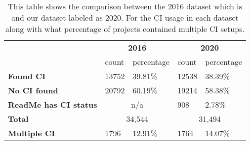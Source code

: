 \begin{table}[!ht]
    \begin{tabular}{l|l|l|l|l|}
    \cline{2-5}
                                                & \multicolumn{2}{c|}{\textbf{2016}} & \multicolumn{2}{c|}{\textbf{2020}} \\ \cline{2-5} 
                                                & count         & percentage         & count         & percentage         \\ \hline
    \multicolumn{1}{|l|}{\textbf{Found CI}}          & 13752         & 39.81\%            & 12538         & 38.39\%            \\ \hline
    \multicolumn{1}{|l|}{\textbf{No CI found}}       & 20792         & 60.19\%            & 19214         & 58.38\%            \\ \hline
    \multicolumn{1}{|l|}{\textbf{ReadMe has CI status}}      & \multicolumn{2}{c|}{n/a}           & 908           & 2.78\%             \\ \hline
    \multicolumn{1}{|l|}{\textbf{Total}}      & \multicolumn{2}{c|}{34,544}           & \multicolumn{2}{c|}{31,494}             \\ \hline
    \multicolumn{1}{|l|}{\textbf{Multiple CI}} & 1796          & 12.91\%            & 1764          & 14.07\%            \\ \hline

    \end{tabular}
    \label{table:comparison_dataset}

    \caption{This table shows the comparison between the 2016 dataset which is\citet{Hilton2016} and our dataset labeled as 2020. For the CI usage in each dataset along with what percentage of projects contained multiple CI setups.}
\end{table}
